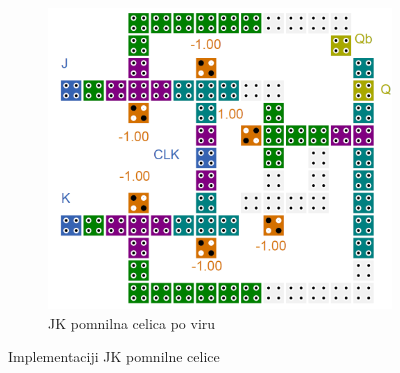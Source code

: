 \documentclass[a4paper, 11pt]{article}
\begin{document}
\begin{figure}[h!]
\begin{subfigure}[b]{0.5\textwidth}
	\includegraphics[width=\textwidth]{../img/vir_5/jk.png} 
	\caption{JK pomnilna celica po viru \cite{a_novel_approach}}
	\label{fig-jk-2}
	\end{subfigure}
	\caption{Implementaciji JK pomnilne celice}
	\label{fig-jk}
\end{figure}
\end{document}
